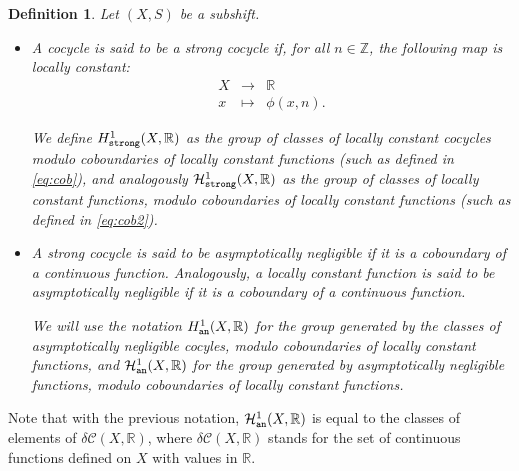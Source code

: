 \documentclass{article}
\newtheorem{definition}[lemma]{Definition}
\theoremstyle{definition}
\newcommand{\R}{\mathbb{R}}
\newcommand{\cH}{\mathcal{H}}
\begin{document}
\begin{definition}\label{def:coho}
Let $(X,S)$ be a subshift.
\begin{itemize} 
\item  A cocycle  is  said to be    a  {\em strong cocycle} if, for all $n \in {\mathbb Z}$,  the following map is  {\em locally constant}:
 $$\begin{array}{ccc}
 X&\to&\R\\
 x& \mapsto& \phi(x,n). 
 \end{array}$$



We   define    $H^1_{\tt{strong}}(X,\mathbb R)$ as the     group  of classes of  locally constant  cocycles  modulo      coboundaries of locally constant  functions (such as defined in \cref{eq:cob}),
and  analogously $\cH^1_{\tt{strong}}(X,\mathbb R)$ as the     group  of classes of  locally constant functions, 
 modulo      coboundaries of locally constant   functions (such as defined in \cref{eq:cob2}).

 \item  
A  strong cocycle  is said to be  \emph{asymptotically negligible} if it is  a  coboundary of a continuous function.
Analogously, a locally constant  function is said to be  {\em asymptotically  negligible} if  it is  a  coboundary of a continuous function.

 We will use the  notation $H^1_{\tt{an}}(X,\mathbb R)$   for  the  group  generated  by the classes of  asymptotically negligible cocyles,  modulo      coboundaries of locally constant  functions,
 and  $\cH^1 _{\tt{an}}(X,\mathbb R)$ for  the group  generated by     asymptotically negligible  functions,  modulo      coboundaries of locally constant   functions. 

\end{itemize}
\end{definition} 
Note that with the previous notation, $\cH^1 _{\tt{an}}(X,\mathbb R)$ is equal to the classes of elements of $ \delta {\mathcal C } (X, {\mathbb R})$, where $ \delta {\mathcal C } (X, {\mathbb R})$
stands for the set of continuous functions defined on $X$ with values in ${\mathbb R}$.
\end{document}
